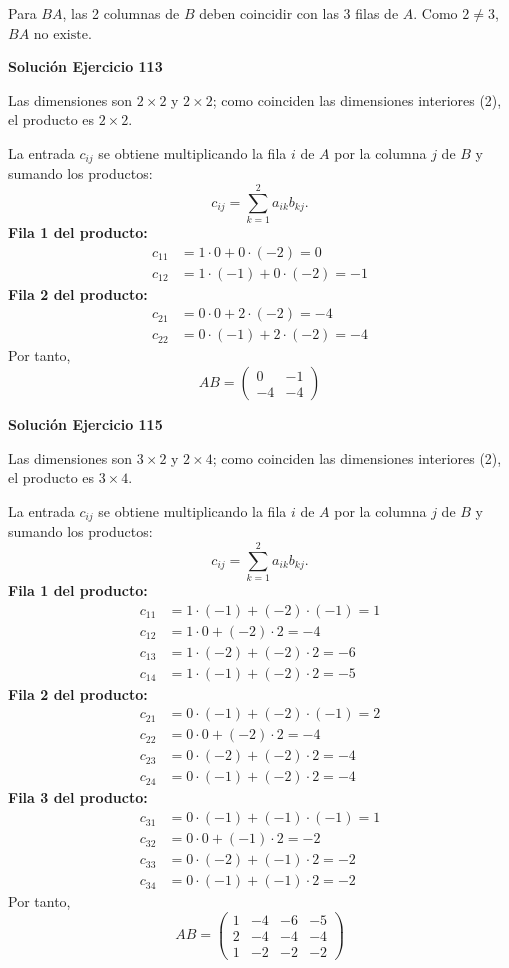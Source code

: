 \documentclass[12pt]{article}
\begin{document}
Para $BA$, las 2 columnas de $B$ deben coincidir con las 3 filas de $A$. Como $2\neq3$, $\boxed{BA\text{ no existe}}$.


\par\bigskip\noindent\textbf{Solución Ejercicio 113}\par\nobreak
Las dimensiones son $2\times2$ y $2\times2$; como coinciden las dimensiones interiores (2), el producto es $2\times2$.

La entrada $c_{ij}$ se obtiene multiplicando la fila $i$ de $A$ por la columna $j$ de $B$ y sumando los productos:
\[
c_{ij}=\sum_{k=1}^{2} a_{ik}b_{kj}.
\]
\textbf{Fila 1 del producto:}
\[
\begin{aligned}c_{11}&=1\cdot 0+0\cdot (-2)=0\\c_{12}&=1\cdot (-1)+0\cdot (-2)=-1\end{aligned}
\]
\textbf{Fila 2 del producto:}
\[
\begin{aligned}c_{21}&=0\cdot 0+2\cdot (-2)=-4\\c_{22}&=0\cdot (-1)+2\cdot (-2)=-4\end{aligned}
\]
Por tanto,
\[
\boxed{AB=\begin{pmatrix}0&-1\\-4&-4\end{pmatrix}}
\]

\par\bigskip\noindent\textbf{Solución Ejercicio 115}\par\nobreak
Las dimensiones son $3\times2$ y $2\times4$; como coinciden las dimensiones interiores (2), el producto es $3\times4$.

La entrada $c_{ij}$ se obtiene multiplicando la fila $i$ de $A$ por la columna $j$ de $B$ y sumando los productos:
\[
c_{ij}=\sum_{k=1}^{2} a_{ik}b_{kj}.
\]
\textbf{Fila 1 del producto:}
\[
\begin{aligned}c_{11}&=1\cdot (-1)+(-2)\cdot (-1)=1\\c_{12}&=1\cdot 0+(-2)\cdot 2=-4\\c_{13}&=1\cdot (-2)+(-2)\cdot 2=-6\\c_{14}&=1\cdot (-1)+(-2)\cdot 2=-5\end{aligned}
\]
\textbf{Fila 2 del producto:}
\[
\begin{aligned}c_{21}&=0\cdot (-1)+(-2)\cdot (-1)=2\\c_{22}&=0\cdot 0+(-2)\cdot 2=-4\\c_{23}&=0\cdot (-2)+(-2)\cdot 2=-4\\c_{24}&=0\cdot (-1)+(-2)\cdot 2=-4\end{aligned}
\]
\textbf{Fila 3 del producto:}
\[
\begin{aligned}c_{31}&=0\cdot (-1)+(-1)\cdot (-1)=1\\c_{32}&=0\cdot 0+(-1)\cdot 2=-2\\c_{33}&=0\cdot (-2)+(-1)\cdot 2=-2\\c_{34}&=0\cdot (-1)+(-1)\cdot 2=-2\end{aligned}
\]
Por tanto,
\[
\boxed{AB=\begin{pmatrix}1&-4&-6&-5\\2&-4&-4&-4\\1&-2&-2&-2\end{pmatrix}}
\]
\end{document}
